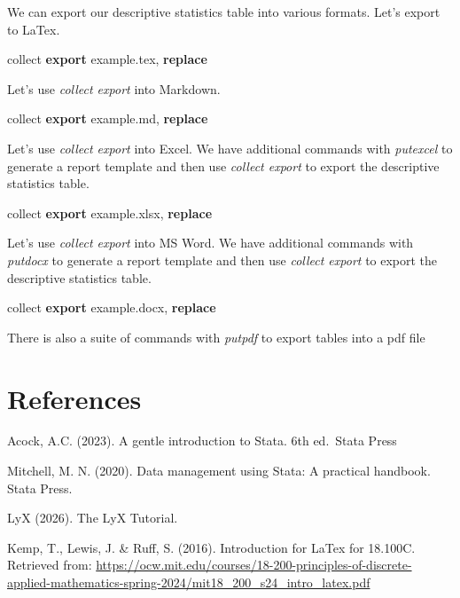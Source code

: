 \documentclass[
]{book}
\newenvironment{Shaded}{\begin{snugshade}}{\end{snugshade}}
\newcommand{\KeywordTok}[1]{\textcolor[rgb]{0.13,0.29,0.53}{\textbf{#1}}}
\newcommand{\NormalTok}[1]{#1}
\begin{document}
We can export our descriptive statistics table into various formats.
Let's export to LaTex.

\begin{Shaded}
\begin{Highlighting}[]
\NormalTok{collect }\KeywordTok{export}\NormalTok{ example.tex, }\KeywordTok{replace}
\end{Highlighting}
\end{Shaded}

Let's use \emph{collect export} into Markdown.

\begin{Shaded}
\begin{Highlighting}[]
\NormalTok{collect }\KeywordTok{export}\NormalTok{ example.md, }\KeywordTok{replace}
\end{Highlighting}
\end{Shaded}

Let's use \emph{collect export} into Excel. We have additional commands with \emph{putexcel} to generate a report template and then use \emph{collect export} to export the descriptive statistics table.

\begin{Shaded}
\begin{Highlighting}[]
\NormalTok{collect }\KeywordTok{export}\NormalTok{ example.xlsx, }\KeywordTok{replace}
\end{Highlighting}
\end{Shaded}

Let's use \emph{collect export} into MS Word. We have additional commands with \emph{putdocx} to generate a report template and then use \emph{collect export} to export the descriptive statistics table.

\begin{Shaded}
\begin{Highlighting}[]
\NormalTok{collect }\KeywordTok{export}\NormalTok{ example.docx, }\KeywordTok{replace}
\end{Highlighting}
\end{Shaded}

There is also a suite of commands with \emph{putpdf} to export tables into a pdf file

\chapter{References}\label{references}

Acock, A.C. (2023). A gentle introduction to Stata. 6th ed.~Stata Press

Mitchell, M. N. (2020). Data management using Stata: A practical handbook. Stata Press.

LyX (2026). The LyX Tutorial.

Kemp, T., Lewis, J. \& Ruff, S. (2016). Introduction for LaTex for 18.100C. Retrieved from: \url{https://ocw.mit.edu/courses/18-200-principles-of-discrete-applied-mathematics-spring-2024/mit18_200_s24_intro_latex.pdf}


\end{document}
